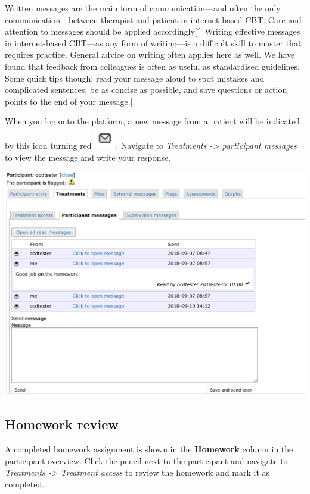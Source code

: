 \documentclass[]{book}
\theoremstyle{definition}
\theoremstyle{definition}
\theoremstyle{definition}
\theoremstyle{remark}
\begin{document}
Written messages are the main form of communication---and often the only
communication---between therapist and patient in internet-based CBT.
Care and attention to messages should be applied accordingly{[}\^{}
Writing effective messages in internet-based CBT---as any form of
writing---is a difficult skill to master that requires practice. General
advice on writing often applies here as well. We have found that
feedback from colleagues is often as useful as standardised guidelines.
Some quick tips though: read your message aloud to spot mistakes and
complicated sentences, be as concise as possible, and save questions or
action points to the end of your message.{]}.

When you log onto the platform, a new message from a patient will be
indicated by this icon turning red
\includegraphics{images/message-icon.png}. Navigate to \emph{Treatments
-\textgreater{} participant messages} to view the message and write your
response.

\includegraphics{images/therapist-messages.png}

\hypertarget{homework-review}{%
\subsection{Homework review}\label{homework-review}}

A completed homework assignment is shown in the \textbf{Homework} column
in the participant overview. Click the pencil next to the participant
and navigate to \emph{Treatments -\textgreater{} Treatment access} to
review the homework and mark it as completed.
\end{document}
